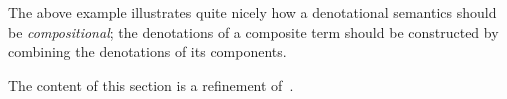The above example illustrates quite nicely how a denotational semantics should
be \emph{compositional}; the denotations of a composite term should be
constructed by combining the denotations of its components.

\begin{remark}
    The content of this section is a refinement
    of~\cite[Section 3]{ghica2024fully}.
\end{remark}






